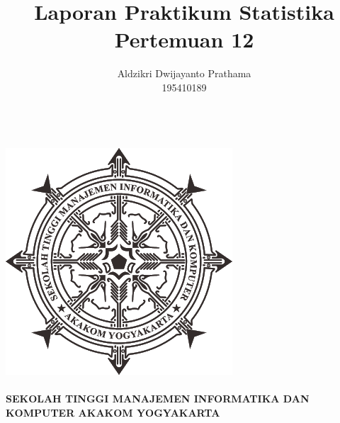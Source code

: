 \documentclass[a4paper,12pt]{article}
\begin{document}
\title{Laporan Praktikum Statistika Pertemuan 12}
\author{Aldzikri Dwijayanto Prathama 
	\\195410189}
\makeatletter
\begin{titlepage}
	\begin{center}
		{\huge \bfseries \@title }\\[14ex]
		\includegraphics[scale=.8]{logo}\\[4ex]
		{\large \@author}\\[20ex]
		{\large \bfseries {SEKOLAH TINGGI MANAJEMEN INFORMATIKA DAN KOMPUTER
				AKAKOM YOGYAKARTA}}
	\end{center}


\end{titlepage}
\makeatother
\newpage
\tableofcontents
\newpage
\end{document}
